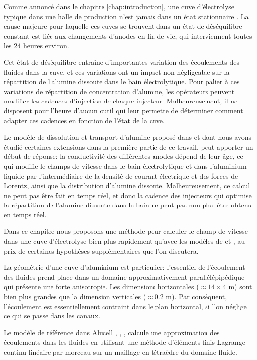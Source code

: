 Comme annoncé dans le chapitre \ref{chap:introduction}, une cuve
d'électrolyse typique dans une halle de production n'est jamais dans
un état stationnaire \cite{Steiner2009,Flotron2013}. La cause
majeure pour laquelle ces cuves se trouvent dans un état de
déséquilibre constant est liée aux changements d'anodes en fin de vie,
qui interviennent toutes les 24 heures environ.

Cet état de déséquilibre entraîne d'importantes variation des
écoulements des fluides dans la cuve, et ces variations ont un impact
non négligeable sur la répartition de l'alumine dissoute dans le bain
électrolytique. Pour palier à ces variations de répartition de
concentration d'alumine, les opérateurs peuvent modifier les cadences
d'injection de chaque injecteur. Malheureusement, il ne disposent pour
l'heure d'aucun outil qui leur permette de déterminer comment adapter
ces cadences en fonction de l'état de la cuve.

Le modèle de dissolution et transport d'alumine proposé dans
\cite{Hofer2011} et dont nous avons étudié certaines extensions dans
la première partie de ce travail, peut apporter un début de réponse: la
conductivité des différentes anodes dépend de leur âge, ce qui modifie
le champs de vitesse dans le bain électrolytique et dans l'aluminium
liquide par l'intermédiaire de la densité de courant
électrique et des forces de Lorentz, ainsi que la distribution d'alumine
dissoute. Malheureusement, ce calcul ne peut pas être fait en temps
réel, et donc la cadence des injecteurs qui optimise la répartition de
l'alumine dissoute dans le bain ne peut pas non plus être obtenu en
temps réel.

Dans ce chapitre nous proposons une méthode pour calculer le champ de
vitesse dans une cuve d'électrolyse bien plus rapidement qu'avec les
modèles de \cite{Steiner2009} et \cite{Hofer2011}, au prix de
certaines hypothèses supplémentaires que l'on discutera.

La géométrie d'une cuve d'aluminium est particulier: l'essentiel de
l'écoulement des fluides prend place dans un domaine approximativement
parallélépipédique qui présente une forte anisotropie. Les dimensions
horizontales ($\approx \num{14}\times\num{4}$ \si{\meter}) sont bien plus
grandes que la dimension verticales ($\approx \num{0.2}$ \si{\meter}). Par
conséquent, l'écoulement est essentiellement contraint dans le plan
horizontal, si l'on néglige ce qui se passe dans les canaux.

Le modèle de référence dans Alucell \cite{Steiner2009},
\cite{Flotron2013}, \cite{Hofer2011}, \cite{Rochat2016} calcule une
approximation des écoulements dans les fluides en utilisant une
méthode d'éléments finis Lagrange continu linéaire par morceau sur un
maillage en tétraèdre du domaine fluide.

